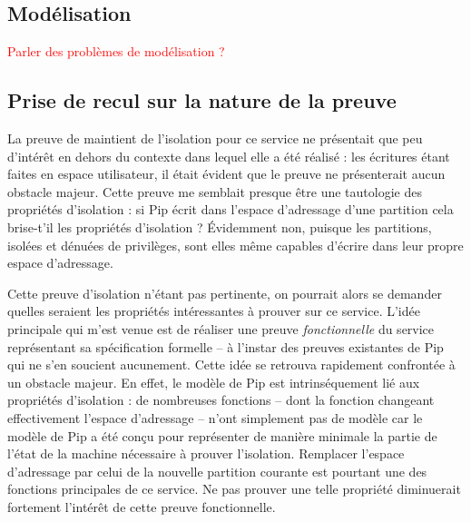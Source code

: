 		\subsection{Modélisation}

		\textcolor{red}{Parler des problèmes de modélisation ?}

		\subsection{Prise de recul sur la nature de la preuve}

		La preuve de maintient de l'isolation pour ce service ne présentait que peu d'intérêt en dehors du contexte dans lequel elle a été réalisé : les écritures étant faites en espace utilisateur, il était évident que le preuve ne présenterait aucun obstacle majeur. Cette preuve me semblait presque être une tautologie des propriétés d'isolation : si Pip écrit dans l'espace d'adressage d'une partition cela brise-t'il les propriétés d'isolation ? Évidemment non, puisque les partitions, isolées et dénuées de privilèges, sont elles même capables d'écrire dans leur propre espace d'adressage.

		Cette preuve d'isolation n'étant pas pertinente, on pourrait alors se demander quelles seraient les propriétés intéressantes à prouver sur ce service. L'idée principale qui m'est venue est de réaliser une preuve \emph{fonctionnelle} du service représentant sa spécification formelle -- à l'instar des preuves existantes de Pip qui ne s'en soucient aucunement. Cette idée se retrouva rapidement confrontée à un obstacle majeur. En effet, le modèle de Pip est intrinséquement lié aux propriétés d'isolation : de nombreuses fonctions -- dont la fonction changeant effectivement l'espace d'adressage -- n'ont simplement pas de modèle car le modèle de Pip a été conçu pour représenter de manière minimale la partie de l'état de la machine nécessaire à prouver l'isolation. Remplacer l'espace d'adressage par celui de la nouvelle partition courante est pourtant une des fonctions principales de ce service. Ne pas prouver une telle propriété diminuerait fortement l'intérêt de cette preuve fonctionnelle.

